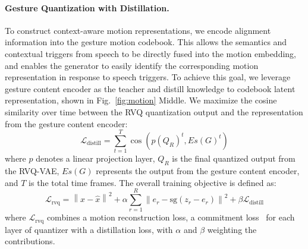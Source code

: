 





\vspace{-0.2cm}
\paragraph{Gesture Quantization with Distillation.}
To construct context-aware motion representations, we encode alignment information into the gesture motion codebook. This allows the semantics and contextual triggers from speech to be directly fused into the motion embedding, and enables the generator to easily identify the corresponding motion representation in response to speech triggers. To achieve this goal, we leverage gesture content encoder as the teacher and distill knowledge to codebook latent representation, shown in Fig.~\ref{fig:motion} Middle. We maximize the cosine similarity over time between the RVQ quantization output and the representation from the gesture content encoder:
\begin{equation}
\mathcal{L}_{\text{distill}} = \sum_{t=1}^{T} \cos\left( p(Q_R)^t, Es(G)^t \right)
\end{equation}
%
where \( p \) denotes a linear projection layer, \( Q_R \) is the final quantized output from the RVQ-VAE, \( Es(G) \) represents the output from the gesture content encoder, and \( T \) is the total time frames. The overall training objective is defined as:
\begin{equation}
\mathcal{L}_{\text{rvq}} = \left\| x - \hat{x} \right\|^2 + \alpha \sum_{r=1}^{R} \left\| e_r - \text{sg} \left( z_r - e_r \right) \right\|^2 + \beta \mathcal{L}_{\text{distill}}
\end{equation}
where \( \mathcal{L}_{\text{rvq}} \) combines a motion reconstruction loss, a commitment loss~\cite{oord2018neuraldiscreterepresentationlearning} for each layer of quantizer with a distillation loss, with \( \alpha \) and \( \beta \) weighting the contributions.




